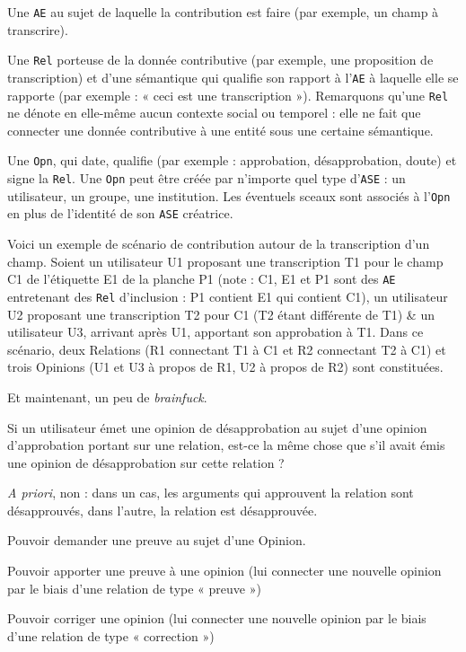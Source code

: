\startitemize
	\item
	Une {\tt AE} au sujet de laquelle la contribution est faire (par exemple, un champ à transcrire).
	\item
	Une {\tt Rel} porteuse de la donnée contributive (par exemple, une proposition de transcription) et d'une sémantique qui qualifie son rapport à l'{\tt AE} à laquelle elle se rapporte (par exemple : « ceci est une transcription »).
	Remarquons qu'une {\tt Rel} ne dénote en elle-même aucun contexte social ou temporel : elle ne fait que connecter une donnée contributive à une entité sous une certaine sémantique.
	\item
	Une {\tt Opn}, qui date, qualifie (par exemple : approbation, désapprobation, doute) et signe la {\tt Rel}.
	Une {\tt Opn} peut être créée par n'importe quel type d'{\tt ASE} : un utilisateur, un groupe, une institution.
	Les éventuels sceaux sont associés à l'{\tt Opn} en plus de l'identité de son {\tt ASE} créatrice.
\stopitemize

Voici un exemple de scénario de contribution autour de la transcription d'un champ.
Soient un utilisateur U1 proposant une transcription T1 pour le champ C1 de l'étiquette E1 de la planche P1 (note : C1, E1 et P1 sont des {\tt AE} entretenant des {\tt Rel} d'inclusion : P1 contient E1 qui contient C1), un utilisateur U2 proposant une transcription T2 pour C1 (T2 étant différente de T1) & un utilisateur U3, arrivant après U1, apportant son approbation à T1.
Dans ce scénario, deux Relations (R1 connectant T1 à C1 et R2 connectant T2 à C1) et trois Opinions (U1 et U3 à propos de R1, U2 à propos de R2) sont constituées.

\bigskip

Et maintenant, un peu de {\it brainfuck}.

Si un utilisateur émet une opinion de désapprobation au sujet d'une opinion d'approbation portant sur une relation, est-ce la même chose que s'il avait émis une opinion de désapprobation sur cette relation ?

{\it A priori}, non : dans un cas, les arguments qui approuvent la relation sont désapprouvés, dans l'autre, la relation est désapprouvée.

\startTODO
\startitemize
	\item Pouvoir demander une preuve au sujet d'une Opinion.
	\item Pouvoir apporter une preuve à une opinion (lui connecter une nouvelle opinion par le biais d'une relation de type « preuve »)
	\item Pouvoir corriger une opinion (lui connecter une nouvelle opinion par le biais d'une relation de type « correction »)
\stopitemize
\stopTODO